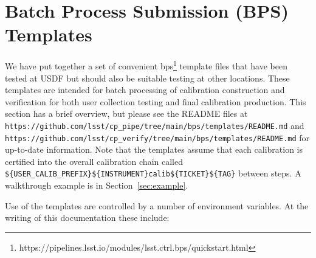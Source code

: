 \documentclass[DM,authoryear,toc]{lsstdoc}
\begin{document}
\section{Batch Process Submission (BPS) Templates}

We have put together a set of convenient bps\footnote{https://pipelines.lsst.io/modules/lsst.ctrl.bps/quickstart.html} template files that have been tested at USDF but should also be suitable testing at other locations.
These templates are intended for batch processing of calibration construction and verification for both user collection testing and final calibration production.
This section has a brief overview, but please see the README files at \texttt{https://github.com/lsst/cp\_pipe/tree/main/bps/templates/README.md} and \texttt{https://github.com/lsst/cp\_verify/tree/main/bps/templates/README.md} for up-to-date information.
Note that the templates assume that each calibration is certified into the overall calibration chain called \texttt{\$\{USER\_CALIB\_PREFIX\}\$\{INSTRUMENT\}\/calib\/\$\{TICKET\}\/\$\{TAG\}} between steps.
A walkthrough example is in Section~\ref{sec:example}.

Use of the templates are controlled by a number of environment variables.
At the writing of this documentation these include:
\end{document}

